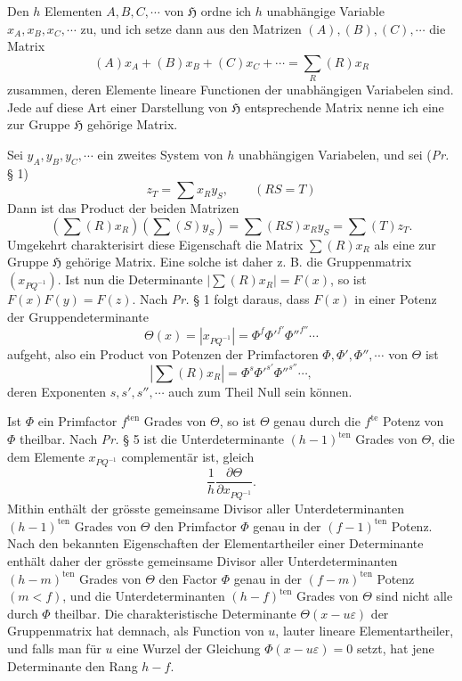 \documentclass[11pt]{article}
\newcommand{\Hgrp}{\mathfrak{H}}
\newcommand{\eps}{\varepsilon}
\newcommand{\ten}{\mathrm{ten}}
\begin{document}
Den $h$ Elementen $A,B,C,\cdots$ von $\Hgrp$ ordne ich $h$ unabhängige Variable $x_A,x_B,x_C,\cdots$ zu, und ich setze dann aus den Matrizen $(A),(B),(C),\cdots$ die Matrix
\[
(A)x_A+(B)x_B+(C)x_C+\cdots=\sum_R(R)x_R
\]
zusammen, deren Elemente lineare Functionen der unabhängigen Variabelen sind. Jede auf diese Art einer Darstellung von $\Hgrp$ entsprechende Matrix nenne ich eine zur Gruppe $\Hgrp$ gehörige Matrix.

Sei $y_A,y_B,y_C,\cdots$ ein zweites System von $h$ unabhängigen Variabelen, und sei (\emph{Pr.} § 1)
\begin{equation}\tag{1.}
z_T=\sum x_Ry_S,\qquad (RS=T)
\end{equation}
Dann ist das Product der beiden Matrizen
\begin{equation}\tag{2.}
\left(\sum(R)x_R\right)\left(\sum(S)y_S\right)=\sum(RS)x_Ry_S=\sum(T)z_T.
\end{equation}
Umgekehrt charakterisirt diese Eigenschaft die Matrix $\sum(R)x_R$ als eine zur Gruppe $\Hgrp$ gehörige Matrix. Eine solche ist daher z. B. die Gruppenmatrix $(x_{PQ^{-1}})$. Ist nun die Determinante $\left|\sum(R)x_R\right|=F(x)$, so ist $F(x)F(y)=F(z)$. Nach \emph{Pr.} § 1 folgt daraus, dass $F(x)$ in einer Potenz der Gruppendeterminante
\[
\Theta(x)=\left|x_{PQ^{-1}}\right|=\Phi^f{\Phi'}^{f'}{\Phi''}^{f''}\cdots
\]
aufgeht, also ein Product von Potenzen der Primfactoren $\Phi,\Phi',\Phi'',\cdots$ von $\Theta$ ist
\begin{equation}\tag{3.}
\left|\sum(R)x_R\right|=\Phi^s{\Phi'}^{s'}{\Phi''}^{s''}\cdots,
\end{equation}
deren Exponenten $s,s',s'',\cdots$ auch zum Theil Null sein können.

Ist $\Phi$ ein Primfactor $f^{\ten}$ Grades von $\Theta$, so ist $\Theta$ genau durch die $f^{\mathrm{te}}$ Potenz von $\Phi$ theilbar. Nach \emph{Pr.} § 5 ist die Unterdeterminante $(h-1)^{\ten}$ Grades von $\Theta$, die dem Elemente $x_{PQ^{-1}}$ complementär ist, gleich
\[
\frac1h\frac{\partial\Theta}{\partial x_{PQ^{-1}}}.
\]
Mithin enthält der grösste gemeinsame Divisor aller Unterdeterminanten $(h-1)^{\ten}$ Grades von $\Theta$ den Primfactor $\Phi$ genau in der $(f-1)^{\ten}$ Potenz. Nach den bekannten Eigenschaften der Elementartheiler einer Determinante enthält daher der grösste gemeinsame Divisor aller Unterdeterminanten $(h-m)^{\ten}$ Grades von $\Theta$ den Factor $\Phi$ genau in der $(f-m)^{\ten}$ Potenz $(m<f)$, und die Unterdeterminanten $(h-f)^{\ten}$ Grades von $\Theta$ sind nicht alle durch $\Phi$ theilbar. Die charakteristische Determinante $\Theta(x-u\eps)$ der Gruppenmatrix hat demnach, als Function von $u$, lauter lineare Elementartheiler, und falls man für $u$ eine Wurzel der Gleichung $\Phi(x-u\eps)=0$ setzt, hat jene Determinante den Rang $h-f$.
\end{document}
